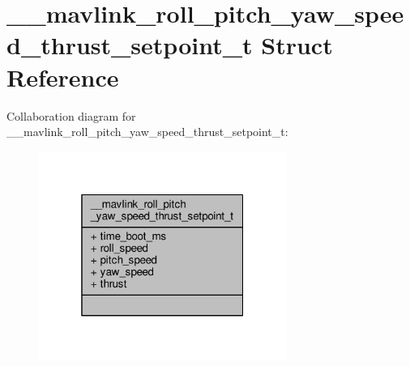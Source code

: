 \hypertarget{struct____mavlink__roll__pitch__yaw__speed__thrust__setpoint__t}{\section{\+\_\+\+\_\+mavlink\+\_\+roll\+\_\+pitch\+\_\+yaw\+\_\+speed\+\_\+thrust\+\_\+setpoint\+\_\+t Struct Reference}
\label{struct____mavlink__roll__pitch__yaw__speed__thrust__setpoint__t}
}


Collaboration diagram for \+\_\+\+\_\+mavlink\+\_\+roll\+\_\+pitch\+\_\+yaw\+\_\+speed\+\_\+thrust\+\_\+setpoint\+\_\+t\+:
\nopagebreak
\begin{figure}[H]
\begin{center}
\leavevmode
\includegraphics[width=229pt]{struct____mavlink__roll__pitch__yaw__speed__thrust__setpoint__t__coll__graph}
\end{center}
\end{figure}
